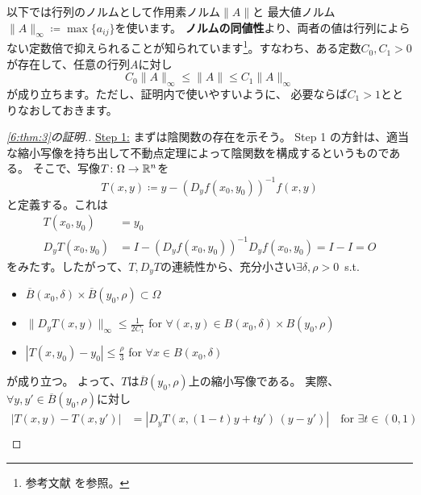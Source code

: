\documentclass[report]{jlreq}
\begin{document}
以下では行列のノルムとして作用素ノルム$\| A \|$と
最大値ノルム$\| A \|_\infty \coloneqq \max \{ a_{ij} \}$を使います。
\textbf{ノルムの同値性}より、両者の値は行列によらない定数倍で抑えられることが知られています\footnote{
    参考文献\cite[p.66]{齋藤} を参照。
}。すなわち、ある定数$C_0, C_1 > 0$が存在して、任意の行列$A$に対し
\begin{equation}
    C_0 \| A \|_\infty \le \| A \| \le C_1 \| A \|_\infty
\end{equation}
が成り立ちます。ただし、証明内で使いやすいように、
必要ならば$C_1 > 1$ととりなおしておきます。

\begin{proof}[\cref{6:thm:3}の証明.]
    \underline{Step 1:}
    まずは陰関数の存在を示そう。
    Step 1 の方針は、適当な縮小写像を持ち出して不動点定理によって陰関数を構成するというものである。
    そこで、写像$T \colon \Omega \to \mathbb{R}^n$を
    \begin{equation}
        T(x, y) \coloneqq y - (D_y f(x_0, y_0))^{-1} f(x, y)
        \label{6:eq:8}
    \end{equation}
    と定義する。これは
    \begin{equation}
        \begin{split}
            T(x_0, y_0) &= y_0 \\
            D_y T(x_0, y_0) &= I - (D_y f(x_0, y_0))^{-1} D_y f(x_0, y_0) = I - I = O
        \end{split}
    \end{equation}
    をみたす。したがって、$T, D_y T$の連続性から、充分小さい$\exists \delta, \rho > 0$\, s.t.
    \begin{itemize}
        \item $\overline{B}(x_0, \delta) \times \overline{B}(y_0, \rho) \subset \Omega$
        \item $\| D_y T(x, y) \|_\infty \le \frac{1}{2C_1}$
            \quad for $\forall (x, y) \in B(x_0, \delta) \times B(y_0, \rho)$
        \item $|T(x, y_0) - y_0| \le \frac{\rho}{3}$ \quad for $\forall x \in B(x_0, \delta)$
    \end{itemize}
    が成り立つ。
    よって、$T$は$\overline{B}(y_0, \rho)$上の縮小写像である。
    実際、$\forall y, y' \in \overline{B}(y_0, \rho)$に対し
    \begin{equation}
        \begin{split}
            |T(x, y) - T(x, y')|
                &= |D_y T(x, (1-t)y + ty')\, (y - y')| \quad \text{for $\exists t \in (0, 1)$} \\

\end{split}
\end{equation}
\end{proof}
\end{document}
